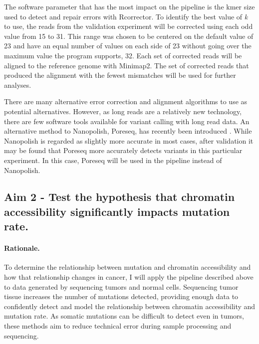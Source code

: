 The software parameter that has the most impact on the pipeline is the kmer size used to detect and repair errors with Rcorrector. To identify the best value of \textit{k} to use, the reads from the validation experiment will be corrected using each odd value from 15 to 31. This range was chosen to be centered on the default value of 23 and have an equal number of values on each side of 23 without going over the maximum value the program supports, 32.
Each set of corrected reads will be aligned to the reference genome with Minimap2. The set of corrected reads that produced the alignment with the fewest mismatches will be used for further analyses.

There are many alternative error correction and alignment algorithms to use as potential alternatives. However, as long reads are a relatively new technology, there are few software tools available for variant calling with long read data.
An alternative method to Nanopolish, Poreseq, has recently been introduced \parencite{szalay_novo_2015}. While Nanopolish is regarded as slightly more accurate in most cases, after validation it may be found that Poreseq more accurately detects variants in this particular experiment. In this case, Poreseq will be used in the pipeline instead of Nanopolish.



\subsection{Aim 2 - Test the hypothesis that chromatin accessibility significantly impacts mutation rate.}
\paragraph{Rationale.}
To determine the relationship between mutation and chromatin accessibility and how that relationship changes in cancer, I will apply the pipeline described above to data generated by sequencing tumors and normal cells. Sequencing tumor tissue increases the number of mutations detected, providing enough data to confidently detect and model the relationship between chromatin accessibility and mutation rate.
As somatic mutations can be difficult to detect even in tumors, these methods aim to reduce technical error during sample processing and sequencing.

